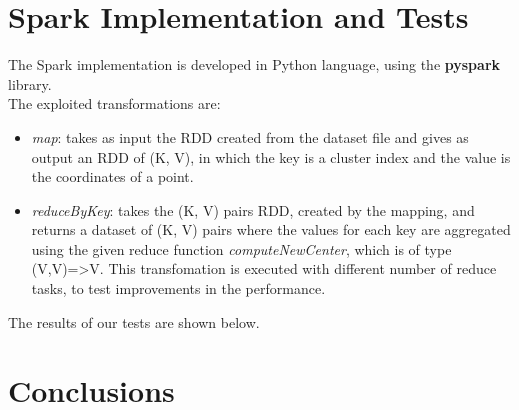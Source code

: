 \documentclass[a4paper, oneside]{article}
\begin{document}
\section{Spark Implementation and Tests}
The Spark implementation is developed in Python language, using the \textbf{pyspark} library.\\
The exploited transformations are:
\begin{itemize}
	\item \textit{map}: takes as input the RDD created from the dataset file and gives as output an RDD of (K, V), in which the key is a cluster index and the value is the coordinates of a point.
	\item \textit{reduceByKey}: takes the (K, V) pairs RDD, created by the mapping, and returns a dataset of (K, V) pairs where the values for each key are aggregated using the given reduce function \textit{computeNewCenter}, which is of type (V,V)=>V. This transfomation is executed with different number of reduce tasks, to test improvements in the performance.
\end{itemize}
The results of our tests are shown below.

\section{Conclusions}
\end{document}
